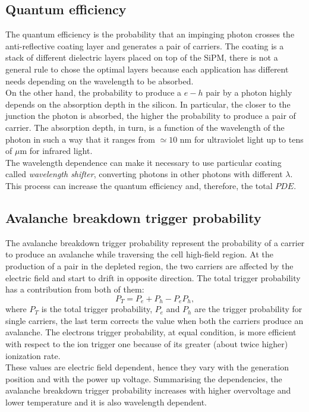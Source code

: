 \subsection*{Quantum efficiency}
The quantum efficiency is the probability that an impinging photon crosses the anti-reflective coating layer and generates a pair of carriers.
The coating is a stack of different dielectric layers placed on top of the SiPM, there is not a general rule to chose the optimal layers because each application has different needs depending on the wavelength to be absorbed.\\
On the other hand, the probability to produce a $e-h$ pair by a photon highly depends on the absorption depth in the silicon. In particular, the closer to the junction the photon is absorbed, the higher the probability to produce a pair of carrier.
The absorption depth, in turn, is a function of the wavelength of the photon in such a way that it ranges from $\simeq 10$ nm for ultraviolet light up to tens of $\mu$m for infrared light.\\
The wavelength dependence can make it necessary to use particular coating called \textit{wavelength shifter}, converting photons in other photons with different $\lambda$. This process can increase the quantum efficiency and, therefore, the total $PDE$.

\subsection*{Avalanche breakdown trigger probability}
The avalanche breakdown trigger probability represent the probability of a carrier to produce an avalanche while traversing the cell high-field region. At the production of a pair in the depleted region, the two carriers are affected by the electric field and start to drift in opposite direction. The total trigger probability has a contribution from both of them:
\begin{equation}
    P_T = P_e + P_h - P_e P_h,
\end{equation}
where $P_T$ is the total trigger probability, $P_e$ and $P_h$ are the trigger probability for single carriers, the last term corrects the value when both the carriers produce an avalanche. 
The electrons trigger probability, at equal condition, is more efficient with respect to the ion trigger one because of its greater (about twice higher) ionization rate.\\
These values are electric field dependent, hence they vary with the generation position and with the power up voltage.
Summarising the dependencies, the avalanche breakdown trigger probability increases with higher overvoltage and lower temperature and it is also wavelength dependent.

